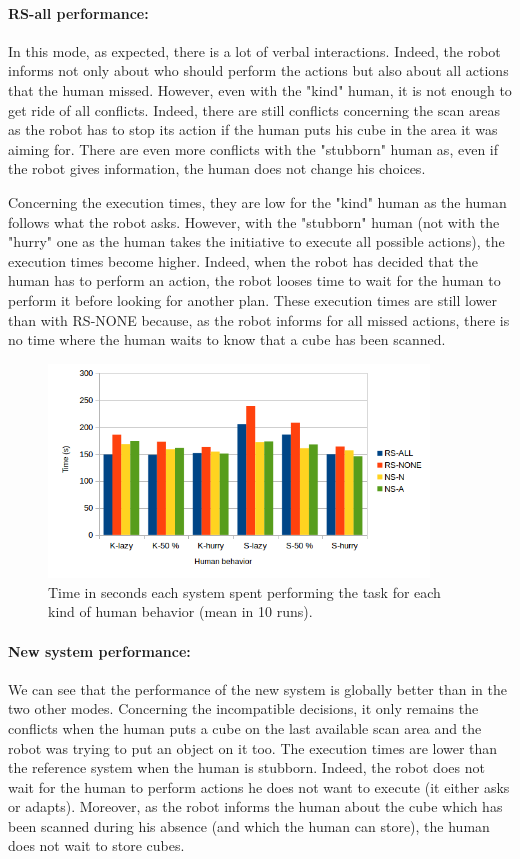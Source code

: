 \documentclass[english,a4paper,11pt,twoside]{StyleThese}
\begin{document}
\paragraph{RS-all performance:}
In this mode, as expected, there is a lot of verbal interactions. Indeed, the robot informs not only about who should perform the actions but also about all actions that the human missed. However, even with the "kind" human, it is not enough to get ride of all conflicts. Indeed, there are still conflicts concerning the scan areas as the robot has to stop its action if the human puts his cube in the area it was aiming for. There are even more conflicts with the "stubborn" human as, even if the robot gives information, the human does not change his choices.

Concerning the execution times, they are low for the "kind" human as the human follows what the robot asks. However, with the "stubborn" human (not with the "hurry" one as the human takes the initiative to execute all possible actions), the execution times become higher. Indeed, when the robot has decided that the human has to perform an action, the robot looses time to wait for the human to perform it before looking for another plan. These execution times are still lower than with RS-NONE because, as the robot informs for all missed actions, there is no time where the human waits to know that a cube has been scanned.

\begin{figure}[!h]
	\centering
    \includegraphics[width=0.9\textwidth]{figs/Chapter5/Time.png}
    \caption{Time in seconds each system spent performing the task for each kind of human behavior (mean in 10 runs).}
    \label{fig:resTime}
\end{figure}


\paragraph{New system performance:}
We can see that the performance of the new system is globally better than in the two other modes. Concerning the incompatible decisions, it only remains the conflicts when the human puts a cube on the last available scan area and the robot was trying to put an object on it too. The execution times are lower than the reference system when the human is stubborn. Indeed, the robot does not wait for the human to perform actions he does not want to execute (it either asks or adapts). Moreover, as the robot informs the human about the cube which has been scanned during his absence (and which the human can store), the human does not wait to store cubes.
\end{document}
